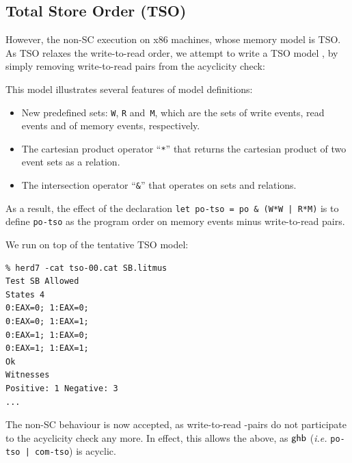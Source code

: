 \subsection{Total Store Order (TSO)}
However, the non-SC execution  on x86 machines,
whose memory model is TSO. As TSO relaxes the write-to-read order, we attempt
to write a TSO model , by simply removing write-to-read
pairs from the acyclicity check:

This model illustrates several features
of model definitions:
\begin{itemize}
\item New predefined sets: \verb+W+, \verb+R+ and~\verb+M+, which are
the sets of write events, read events and of memory events, respectively.
\item The cartesian product operator ``\verb+*+'' that returns the cartesian
product of two event sets as a relation.
\item The intersection operator ``\verb+&+'' that operates on sets and
relations.
\end{itemize}
As a result, the effect of the declaration
\verb+let po-tso = po & (W*W | R*M)+ is to define \verb+po-tso+
as the program order on memory events minus write-to-read pairs.

We run  on top of the tentative TSO model:
\begin{verbatim}
% herd7 -cat tso-00.cat SB.litmus
Test SB Allowed
States 4
0:EAX=0; 1:EAX=0;
0:EAX=0; 1:EAX=1;
0:EAX=1; 1:EAX=0;
0:EAX=1; 1:EAX=1;
Ok
Witnesses
Positive: 1 Negative: 3
...
\end{verbatim}
\label{sb:image}The non-SC behaviour is now accepted, as write-to-read -pairs
do not participate to the acyclicity check any more. In effect, this allows
the  above,
as $\textsf{ghb}$ (\emph{i.e.}
\verb+po-tso | com-tso+) is acyclic.
\begin{center}\end{center}


